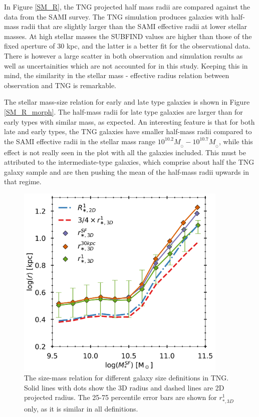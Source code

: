 In Figure \ref{SM_R}, the TNG projected half mass radii are compared against the data from the SAMI survey. The TNG simulation produces galaxies with half-mass radii that are slightly larger than the SAMI effective radii at lower stellar masses. At high stellar masses the SUBFIND values are higher than those of the fixed aperture of 30 kpc, and the latter is a better fit for the observational data. There is however a large scatter in both observation and simulation results as well as uncertainities which are not accounted for in this study. Keeping this in mind, the similarity in the stellar mass - effective radius relation between observation and TNG is remarkable. 

The stellar mass-size relation for early and late type galaxies is shown in Figure \ref{SM_R_morph}. The half-mass radii for late type galaxies are larger than for early types with similar mass, as expected. An interesting feature is that for both late and early types, the TNG galaxies have smaller half-mass radii compared to the SAMI effective radii in the stellar mass range $10^{10.2} M_{_\odot} - 10^{10.7} M_{_\odot}$, while this effect is not really seen in the plot with all the galaxies included. This must be attributed to the intermediate-type galaxies, which comprise about half the TNG galaxy sample and are then pushing the mean of the half-mass radii upwards in that regime. 

\begin{figure}
    \centering
    \includegraphics[width=0.9\textwidth]{images/SM_R_tng.png}
    \caption{The size-mass relation for different galaxy size definitions in TNG. Solid lines with dots show the 3D radius and dashed lines are 2D projected radius. The 25-75 percentile error bars are shown for $r^{1}_{*, 3D}$ only, as it is similar in all definitions.}
    \label{SM_R_TNG}
\end{figure}



